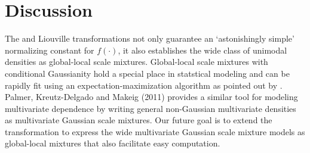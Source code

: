 \documentclass[lineno]{biometrika}
\begin{document}
\section{Discussion}

The \CS and Liouville transformations not only guarantee an `astonishingly simple' normalizing constant for $f(\cdot)$, it also establishes the wide class of unimodal densities as global-local scale mixtures. Global-local scale mixtures with conditional Gaussianity hold a special place in statstical modeling and can be rapidly fit using an expectation-maximization algorithm as pointed out by \cite{polson2013data}. Palmer, Kreutz-Delgado and Makeig (2011) provides a similar tool for modeling multivariate dependence by writing general non-Gaussian multivariate densities as multivariate Gaussian scale mixtures. Our future goal is to extend the \CS transformation to express the wide multivariate Gaussian scale mixture models as global-local mixtures that also facilitate easy computation. \par
\end{document}
